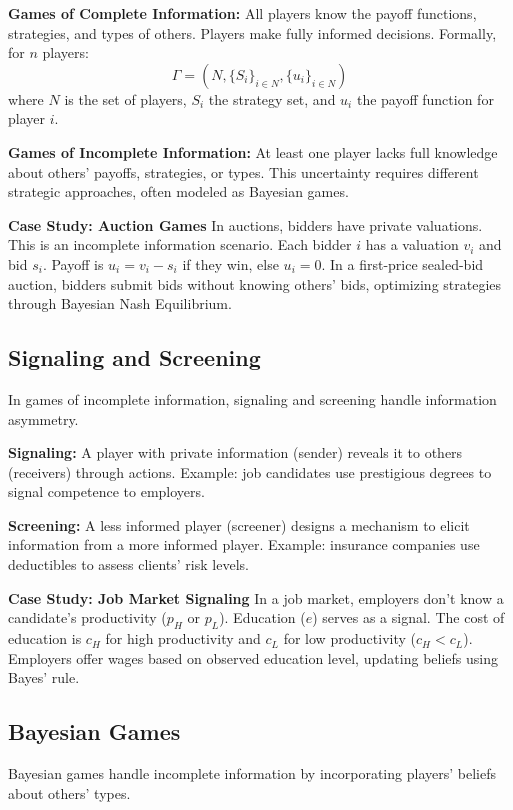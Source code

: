 \documentclass[12pt]{book} %
\begin{document}
\textbf{Games of Complete Information:} 
All players know the payoff functions, strategies, and types of others. Players make fully informed decisions. Formally, for $n$ players:
\[ \Gamma = (N, \{S_i\}_{i \in N}, \{u_i\}_{i \in N}) \]
where $N$ is the set of players, $S_i$ the strategy set, and $u_i$ the payoff function for player $i$.

\textbf{Games of Incomplete Information:} 
At least one player lacks full knowledge about others' payoffs, strategies, or types. This uncertainty requires different strategic approaches, often modeled as Bayesian games.

\textbf{Case Study: Auction Games}
In auctions, bidders have private valuations. This is an incomplete information scenario. Each bidder $i$ has a valuation $v_i$ and bid $s_i$. Payoff is $u_i = v_i - s_i$ if they win, else $u_i = 0$. In a first-price sealed-bid auction, bidders submit bids without knowing others' bids, optimizing strategies through Bayesian Nash Equilibrium.

\subsection{Signaling and Screening}

In games of incomplete information, signaling and screening handle information asymmetry.

\textbf{Signaling:} 
A player with private information (sender) reveals it to others (receivers) through actions. Example: job candidates use prestigious degrees to signal competence to employers.

\textbf{Screening:} 
A less informed player (screener) designs a mechanism to elicit information from a more informed player. Example: insurance companies use deductibles to assess clients' risk levels.

\textbf{Case Study: Job Market Signaling}
In a job market, employers don't know a candidate's productivity ($p_H$ or $p_L$). Education ($e$) serves as a signal. The cost of education is $c_H$ for high productivity and $c_L$ for low productivity ($c_H < c_L$). Employers offer wages based on observed education level, updating beliefs using Bayes' rule.

\subsection{Bayesian Games}

Bayesian games handle incomplete information by incorporating players' beliefs about others' types.
\end{document}

